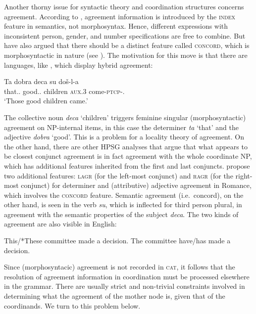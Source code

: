 {Another thorny issue for syntactic theory and coordination structures concerns agreement. According to 
\citet[Section~2.4.2]{pollardsag}, agreement information is introduced by the \textsc{index} feature in semantics, not morphosyntax. Hence, different expressions
with inconsistent person, gender, and number specifications are free to combine. But \citet[Chapter~2]{wechsler} have also argued that there should be a distinct feature called \textsc{concord}, which is morphosyntactic in nature (see ). The motivation for this move is that there are languages, like , 
which display hybrid agreement:

\begin{exe}
\ex \gll Ta dobra deca su do\v{s}-l-a\\
         that.\SG.\F{} good.\SG.\F{} children \textsc{aux}.3\PL{} come-\textsc{ptcp}-\N.\PL\\
  \glt `Those good children came.'  \citep[51]{wechsler} 
\end{exe}

\noindent
The collective noun \emph{deca} `children' triggers feminine singular (morphosyntactic) agreement on NP-internal items, in this case the determiner \emph{ta} `that' and the adjective \emph{dobra} `good'.   This is a problem for a locality theory of agreement. On the other hand, there are other HPSG analyses that argue that what appears to be closest conjunct agreement is in fact agreement with the whole coordinate NP, which has additional features inherited from the first and last conjuncts. \citet[Section~5]{Villavicencio:Sadler:ea:05} propose two additional features: \textsc{lagr} (for the left-most conjunct) and \textsc{ragr} (for the right-most conjunct) for determiner and (attributive) adjective agreement in Romance, which involves the \textsc{concord} feature.
Semantic agreement (i.e.\ concord), on the other hand, is seen in the verb \emph{su}, which  is inflected for third person plural, in agreement with the semantic properties of the subject \emph{deca}. The two kinds of agreement are also visible in
English:

\begin{exe}
\ex
\begin{xlista}
\ex This/*These committee made a decision.
\ex The committee have/has made a decision.
\end{xlista}
\end{exe}


\noindent
Since (morphosyntacic) agreement is not recorded in \textsc{cat}, it follows that the resolution of agreement information in coordination must be processed elsewhere in the grammar. There are usually strict and non-trivial constraints involved in determining what the agreement of the mother node is, given that of the coordinands. We turn to this problem below.






}
